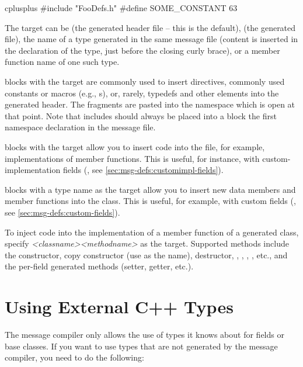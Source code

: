 \begin{msg}
cplusplus {{
#include "FooDefs.h"
#define SOME_CONSTANT 63
}}
\end{msg}

The target can be  (the generated header file -- this is the default),
 (the generated  file), the name of a type generated in the
same message file (content is inserted in the declaration of the type, just
before the closing curly brace), or a member function name of one such type.

 blocks with the target  are commonly used to insert
 directives, commonly used constants or macros (e.g.,
s), or, rarely, typedefs and other elements into the generated
header. The fragments are pasted into the namespace which is open at that point.
Note that includes should always be placed into a  block
 the first namespace declaration in the message file.

 blocks with the target  allow you to insert code
into the  file, for example, implementations of member functions. This
is useful, for instance, with custom-implementation fields (,
see \ref{sec:msg-defs:customimpl-fields}).

 blocks with a type name as the target allow you to insert
new data members and member functions into the class. This is useful, for
example, with custom fields (, see
\ref{sec:msg-defs:custom-fields}).

To inject code into the implementation of a member function of a generated
class, specify \textit{<classname>}\ttt{::}\textit{<methodname>} as the target.
Supported methods include the constructor, copy constructor (use  as
the name), destructor, , , ,
, etc., and the per-field generated methods (setter, getter,
etc.).



\section{Using External C++ Types}
\label{sec:msg-defs:using-cpp-types}
\label{sec:msg-defs:announcing-types} %

The message compiler only allows the use of types it knows about for fields or
base classes. If you want to use types that are not generated by the message
compiler, you need to do the following:

